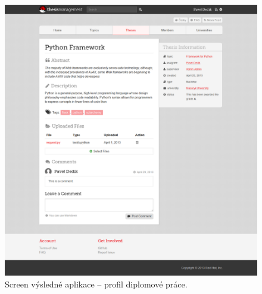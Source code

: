 \begin{figure}[htbp]
    \centering
    \includegraphics[width=\textwidth]{images/tms.png}
    \caption{Screen výsledné aplikace -- profil diplomové práce.}
    \label{img:tms}
\end{figure}
